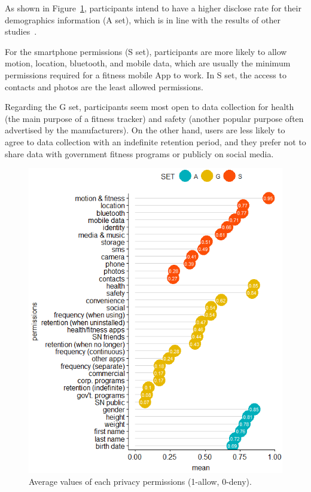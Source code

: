 As shown in Figure~\ref{fig:mean}, participants intend to have a higher disclose rate for their demographics information (A set), which is in line with the results of other studies~\cite{knijnenburg2013helping}.

For the smartphone permissions (S set), participants are more likely to allow motion, location, bluetooth, and mobile data, which are usually the minimum permissions required for a fitness mobile App to work. In S set, the access to contacts and photos are the least allowed permissions.

Regarding the G set, participants seem most open to data collection for health (the main purpose of a fitness tracker) and safety (another popular purpose often advertised by the manufacturers). On the other hand, users are less likely to agree to data collection with an indefinite retention period, and they prefer not to share data with government fitness programs or publicly on social media. 

\begin{figure}
	\includegraphics[width=\linewidth]{figures/sum2.png}
	\caption{Average values of each privacy permissions (1-allow, 0-deny).}
	\label{fig:mean}      
\end{figure}
%

